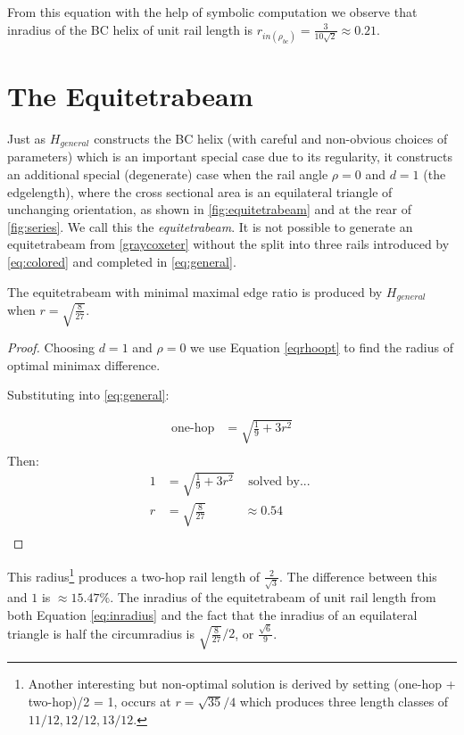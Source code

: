 \documentclass[review]{siamonline1116}
\begin{document}
From this equation with the help of symbolic computation we observe that inradius of the BC helix of unit rail length is $r_{in(\rho_{bc})} = \frac{3}{10\sqrt{2}} \approx 0.21$.

\section{The Equitetrabeam}
\label{sec:equitetrabeam}

Just as $H_{general}$ constructs the BC helix (with careful and non-obvious choices of parameters)
which is an important
special case due to its regularity, it constructs an additional special
(degenerate) case when the rail angle $\rho = 0$
and $d = 1$ (the edgelength), where the cross sectional area is
an equilateral triangle of unchanging orientation, as shown in \cref{fig:equitetrabeam} and at the rear of \cref{fig:series}.
We call this the \emph{equitetrabeam}. It is not possible to generate an equitetrabeam from \cref{graycoxeter}
without the split into three rails introduced by \cref{eq:colored} and completed in \cref{eq:general}.



\begin{corollary}
  The equitetrabeam with minimal maximal edge ratio is produced
  \newline by $H_{general}$ when $ r = \sqrt{\frac{8}{27}} $.
\end{corollary}

\begin{proof}
Choosing $d = 1$ and $\rho = 0$ we use Equation \eqref{eqrhoopt} to find the radius of 
optimal minimax difference.

Substituting into \eqref{eq:general}:

\begin{align*}
  \text{one-hop} &= \sqrt{\frac{1}{9} + 3r^2}\\
\end{align*}
Then:
\begin{align*}
   1  &=  \sqrt{\frac{1}{9} + 3r^2} & \text{ solved by... }\\
   r  &= \sqrt{\frac{8}{27}} &\approx 0.54 \\
\end{align*}
\end{proof}

This radius\footnote{Another interesting but non-optimal solution is derived by setting
  (one-hop + two-hop)/2 = 1,
  occurs at $r = \sqrt{35}/4$ which produces
  three length classes of $11/12, 12/12, 13/12$.}
produces a two-hop rail length of $\frac{2}{\sqrt{3}}$.
The difference between this and $1$ is $\approx 15.47\% $. The inradius of the equitetrabeam of unit
rail length from both Equation \eqref{eq:inradius} and the fact that the inradius of
an equilateral triangle is half the circumradius is $\sqrt{\frac{8}{27}}/2$, or $\frac{\sqrt{6}}{9}$.
\end{document}
